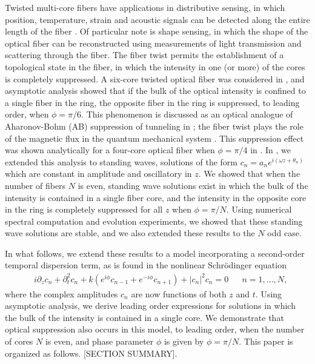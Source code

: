 \documentclass[11pt,reqno]{amsart}
\begin{document}
Twisted multi-core fibers have applications in distributive sensing, in which position, temperature, strain and acoustic signals can be detected along the entire length of the fiber \cite{Gannot2014,Westbrook2017}. Of particular note is shape sensing, in which the shape of the optical fiber can be reconstructed using measurements of light transmission and scattering through the fiber. The fiber twist permits the establishment of a topological state in the fiber, in which the intensity in one (or more) of the cores is completely suppressed. A six-core twisted optical fiber was considered in \cite{castro2016}, and asymptotic analysis showed that if the bulk of the optical intensity is confined to a single fiber in the ring, the opposite fiber in the ring is suppressed, to leading order, when $\phi = \pi/6$. This phenomenon is discussed as an optical analogue of Aharonov-Bohm (AB) suppression of tunneling in \cite{Ornigotti2007,Parto2017,Parto2019}; the fiber twist plays the role of the magnetic flux in the quantum mechanical system \cite{Loss1992}. This suppression effect was shown analytically for a four-core optical fiber when $\phi=\pi/4$ in \cite{Parto2019}. In \cite{parker2021}, we extended this analysis to standing waves, solutions of the form $c_n = a_n e^{i (\omega z + \theta_n) }$ which are constant in amplitude and oscillatory in $z$. We showed that when the number of fibers $N$ is even, standing wave solutions exist in which the bulk of the intensity is contained in a single fiber core, and the intensity in the opposite core in the ring is completely suppressed for all $z$ when $\phi = \pi/N$. Using numerical spectral computation and evolution experiments, we showed that these standing wave solutions are stable, and we also extended these results to the $N$ odd case.

In what follows, we extend these results to a model incorporating a second-order temporal dispersion term, as is found in the nonlinear Schr\"odinger equation
\begin{align}\label{eq:cnz}
&i\partial_z c_n + \partial_t^2 c_n + k\left(e^{i\phi}c_{n-1}+e^{-i\phi}c_{n+1}\right)+|c_n|^2 c_n = 0 && n = 1, \dots, N,
\end{align}
where the complex amplitudes $c_n$ are now functions of both $z$ and $t$. Using asymptotic analysis, we derive leading order expressions for solutions in which the bulk of the intensity is contained in a single core. We demonstrate that optical suppression also occurs in this model, to leading order, when the number of cores $N$ is even, and phase parameter $\phi$ is given by $\phi=\pi/N$. This paper is organized as follows. [SECTION SUMMARY].
\end{document}
